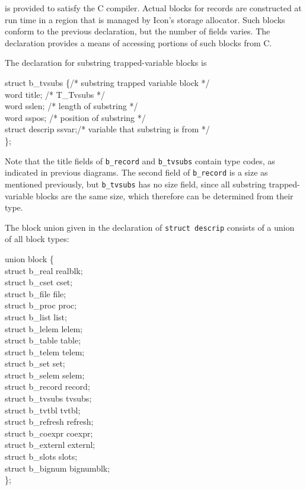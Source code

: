 
\noindent is provided to satisfy the C compiler. Actual blocks for
records are constructed at run time in a region that is managed by
Icon's storage allocator. Such blocks conform to the previous
declaration, but the number of fields varies. The declaration provides
a means of accessing portions of such blocks from C.

The declaration for substring trapped-variable blocks is

\begin{iconcode}
struct b\_tvsubs \{\>\>\>\>\>\>\>\>/* substring trapped variable block */\\
\>word title;\>\>\>\>\>\>\>	    /* T\_Tvsubs */\\
\>word sslen;\>\>\>\>\>\>\>		/* length of substring */\\
\>word sspos;\>\>\>\>\>\>\>		/*  position of substring */\\
\>struct descrip ssvar;\>\>\>\>\>\>\>/* variable that substring is from */\\
\};
\end{iconcode}

Note that the title fields of \texttt{b\_record} and
\texttt{b\_tvsubs} contain type codes, as indicated in previous
diagrams. The second field of \texttt{b\_record} is a size as
mentioned previously, but \texttt{b\_tvsubs} has no size field, since
all substring trapped-variable blocks are the same size, which therefore
can be determined from their type.

The block union given in the declaration of \texttt{struct descrip}
consists of a union of all block types:

\begin{iconcode}
\>union block \{\\
\>\>struct b\_real realblk;\\
\>\>struct b\_cset cset;\\
\>\>struct b\_file file;\\
\>\>struct b\_proc proc;\\
\>\>struct b\_list list;\\
\>\>struct b\_lelem lelem;\\
\>\>struct b\_table table;\\
\>\>struct b\_telem telem;\\
\>\>struct b\_set set;\\
\>\>struct b\_selem selem;\\
\>\>struct b\_record record;\\
\>\>struct b\_tvsubs tvsubs;\\
\>\>struct b\_tvtbl tvtbl;\\
\>\>struct b\_refresh refresh;\\
\>\>struct b\_coexpr coexpr;\\
\>\>struct b\_externl externl;\\
\>\>struct b\_slots slots;\\
\>\>struct b\_bignum bignumblk;\\
\>\};
\end{iconcode}

